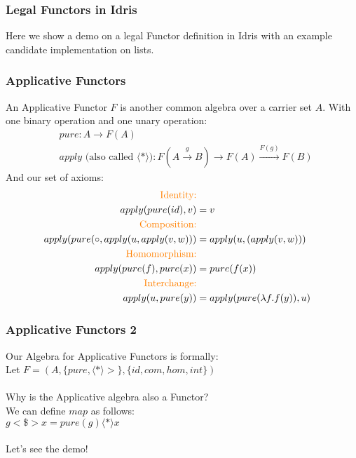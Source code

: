 \documentclass[hyperref={colorlinks = true,linkcolor = blue, citecolor = blue, urlcolor = blue}]{beamer}
\begin{document}
\begin{frame}[fragile]
  \frametitle{Legal Functors in Idris}
  Here we show a demo on a legal Functor definition in Idris with an example
  candidate implementation on lists.
\end{frame}

\begin{frame}[fragile]
  \frametitle{Applicative Functors}
  An Applicative Functor $F$ is another common algebra over a carrier set $A$.
  With one binary operation and one unary operation: 
  \begin{align*}
    &pure : A \rightarrow F(A) \\
    &apply \text{ (also called $\langle \ast \rangle$)} : F(A \overset{g}{\rightarrow} B) \rightarrow F(A) 
               \overset{F(g)}{\rightarrow} F(B)
  \end{align*}
   And our set of axioms:
   \begin{align*}
    \text{\color{orange}{Identity:}}\\
    apply(pure(id), v) &= v \\
    \text{\color{orange}{Composition:}}\\
    apply(pure(\circ,apply(u, apply(v, w))) &= apply(u,(apply(v, w))) \\
    \text{\color{orange}{Homomorphism:}}\\
    apply(pure(f), pure(x)) &= pure(f(x)) \\
    \text{\color{orange}{Interchange:}}\\
    apply(u, pure(y)) &= apply(pure(\lambda f.f(y)),u) 
   \end{align*}
\end{frame}

\begin{frame}[fragile]
  \frametitle{Applicative Functors 2}
  Our Algebra for Applicative Functors is formally: \\
  Let $F = (A,\{pure,\langle \ast \rangle>\},\{id, com, hom, int\})$ \\
  \\
  Why is the Applicative algebra also a Functor? \\
  We can define $map$ as follows: \\
  $g <\$> x = pure(g) \langle \ast \rangle x$ \\
  \\
  Let's see the demo!
\end{frame}

\end{document}
